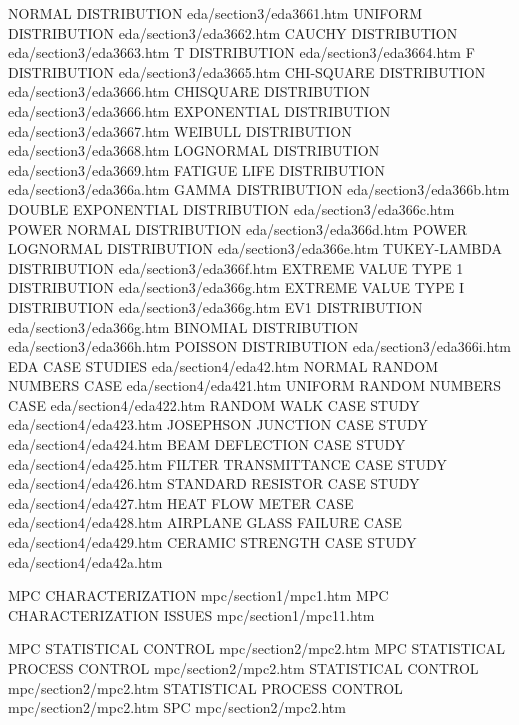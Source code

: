 NORMAL DISTRIBUTION                     eda/section3/eda3661.htm
UNIFORM DISTRIBUTION                    eda/section3/eda3662.htm
CAUCHY DISTRIBUTION                     eda/section3/eda3663.htm
T DISTRIBUTION                          eda/section3/eda3664.htm
F DISTRIBUTION                          eda/section3/eda3665.htm
CHI-SQUARE DISTRIBUTION                 eda/section3/eda3666.htm
CHISQUARE DISTRIBUTION                  eda/section3/eda3666.htm
EXPONENTIAL DISTRIBUTION                eda/section3/eda3667.htm
WEIBULL DISTRIBUTION                    eda/section3/eda3668.htm
LOGNORMAL DISTRIBUTION                  eda/section3/eda3669.htm
FATIGUE LIFE DISTRIBUTION               eda/section3/eda366a.htm
GAMMA DISTRIBUTION                      eda/section3/eda366b.htm
DOUBLE EXPONENTIAL DISTRIBUTION         eda/section3/eda366c.htm
POWER NORMAL DISTRIBUTION               eda/section3/eda366d.htm
POWER LOGNORMAL DISTRIBUTION            eda/section3/eda366e.htm
TUKEY-LAMBDA DISTRIBUTION               eda/section3/eda366f.htm
EXTREME VALUE TYPE 1 DISTRIBUTION       eda/section3/eda366g.htm
EXTREME VALUE TYPE I DISTRIBUTION       eda/section3/eda366g.htm
EV1 DISTRIBUTION                        eda/section3/eda366g.htm
BINOMIAL DISTRIBUTION                   eda/section3/eda366h.htm
POISSON DISTRIBUTION                    eda/section3/eda366i.htm
EDA CASE STUDIES                        eda/section4/eda42.htm
NORMAL RANDOM NUMBERS CASE              eda/section4/eda421.htm
UNIFORM RANDOM NUMBERS CASE             eda/section4/eda422.htm
RANDOM WALK CASE STUDY                  eda/section4/eda423.htm
JOSEPHSON JUNCTION CASE STUDY           eda/section4/eda424.htm
BEAM DEFLECTION CASE STUDY              eda/section4/eda425.htm
FILTER TRANSMITTANCE CASE STUDY         eda/section4/eda426.htm
STANDARD RESISTOR CASE STUDY            eda/section4/eda427.htm
HEAT FLOW METER CASE                    eda/section4/eda428.htm
AIRPLANE GLASS FAILURE CASE             eda/section4/eda429.htm
CERAMIC STRENGTH CASE STUDY             eda/section4/eda42a.htm

MPC CHARACTERIZATION                    mpc/section1/mpc1.htm
MPC CHARACTERIZATION ISSUES             mpc/section1/mpc11.htm

MPC STATISTICAL CONTROL                 mpc/section2/mpc2.htm
MPC STATISTICAL PROCESS CONTROL         mpc/section2/mpc2.htm
STATISTICAL CONTROL                     mpc/section2/mpc2.htm
STATISTICAL PROCESS CONTROL             mpc/section2/mpc2.htm
SPC                                     mpc/section2/mpc2.htm

